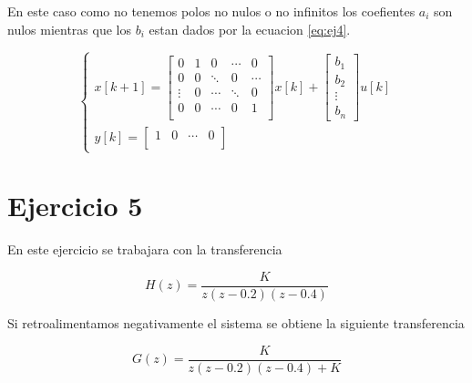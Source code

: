 \documentclass{article}
\newcommand{\syseq}[1]{ \left\{  
                            \begin{array}{c}
                                #1
                            \end{array}
                        \right. }
\begin{document}
            En este caso como no tenemos polos no nulos o no infinitos los coefientes $a_i$ son nulos mientras que los $b_i$ estan dados por la ecuacion \ref{eq:ej4}.

            \begin{equation}
                \syseq{
                    x[k+1] = 
                        \begin{bmatrix}
                            0 & 1 & 0 & \cdots & 0 \\
                            0 & 0 & \ddots & 0 & \cdots \\
                            \vdots & 0 & \cdots & \ddots & 0\\
                            0 & 0 & \cdots & 0 & 1\\
                        \end{bmatrix} x[k] + 
                        \begin{bmatrix}
                            b_1 \\
                            b_2 \\ 
                            \vdots \\ 
                            b_n
                        \end{bmatrix}u[k] \\
                    y[k] = 
                        \begin{bmatrix}
                            1 & 0 & \cdots & 0\\
                        \end{bmatrix}
                }
            \end{equation}

    \section{Ejercicio 5}

        En este ejercicio se trabajara con la transferencia 

        \begin{equation}
            H(z) = \frac{K}{z(z-0.2)(z-0.4)}
        \end{equation}

        Si retroalimentamos negativamente el sistema se obtiene la siguiente transferencia 

        \begin{equation}
            G(z) = \frac{K}{z(z-0.2)(z-0.4) + K}
        \end{equation}
\end{document}
